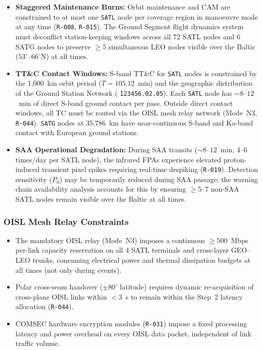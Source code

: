\begin{itemize}
    \item \textbf{Staggered Maintenance Burns:} Orbit maintenance and CAM are constrained to at most one \texttt{SATL} node per coverage region in manoeuvre mode at any time (\texttt{R-008}, \texttt{R-015}). The Ground Segment flight dynamics system must deconflict station-keeping windows across all 72 SATL nodes and 6 SATG nodes to preserve $\ge 5$ simultaneous LEO nodes visible over the Baltic ($53^\circ$--$66^\circ$N) at all times.
    \item \textbf{TT\&C Contact Windows:} S-band TT\&C for \texttt{SATL} nodes is constrained by the 1,000~km orbit period ($T = 105.12$~min) and the geographic distribution of the Ground Station Network ( \texttt{123456.02.05}). Each \texttt{SATL} node has ${\sim}8$--$12$~min of direct S-band ground contact per pass. Outside direct contact windows, all TC must be routed via the OISL mesh relay network (Mode~N3, \texttt{R-044}). \texttt{SATG} nodes at 35,786~km have near-continuous S-band and Ka-band contact with European ground stations.
    \item \textbf{SAA Operational Degradation:} During SAA transits (${\sim}8$--$12$~min, 4--6 times/day per SATL node), the infrared FPAs experience elevated proton-induced transient pixel spikes requiring real-time despiking (\texttt{R-019}). Detection sensitivity ($P_d$) may be temporarily reduced during SAA passage; the warning chain availability analysis accounts for this by ensuring $\ge 5$--$7$ non-SAA SATL nodes remain visible over the Baltic at all times.
\end{itemize}

\subsubsection{OISL Mesh Relay Constraints}

\begin{itemize}
    \item The mandatory OISL relay (Mode~N3) imposes a continuous $\ge 500$~Mbps per-link capacity reservation on all 4 SATL terminals and cross-layer GEO--LEO trunks, consuming electrical power and thermal dissipation budgets at all times (not only during events).
    \item Polar cross-seam handover ($\pm 80^\circ$ latitude) requires dynamic re-acquisition of cross-plane OISL links within $< 3$~s to remain within the Step~2 latency allocation (\texttt{R-044}).
    \item COMSEC hardware encryption modules (\texttt{R-031}) impose a fixed processing latency and power overhead on every OISL data packet, independent of link traffic volume.
\end{itemize}

